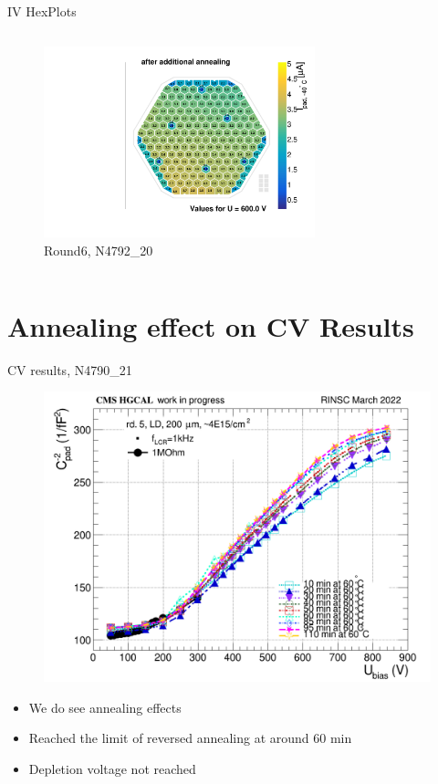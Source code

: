 \documentclass{beamer}
\begin{document}
\begin{frame}{IV HexPlots}
\begin{columns}
    \begin{figure}
      \includegraphics[width=0.7\textwidth]{plots/N4792_20.pdf}
      \caption{Round6, N4792\_20}
    \end{figure}

  \end{columns}
\end{frame}




\section{Annealing effect on CV Results}

\begin{frame}{CV results, N4790\_21}
  \begin{figure}
      \includegraphics[width=.6\textwidth]{plots/8in_198ch_2019_N4790_21_4E15_neg40degC_annealing_CV_ch101.png}    
  \end{figure}
  \begin{itemize}
    \item We do see annealing effects
    \item Reached the limit of reversed annealing at around \alert{60 min}
    \item  Depletion voltage not reached 
  \end{itemize}
\end{frame}
\end{document}
